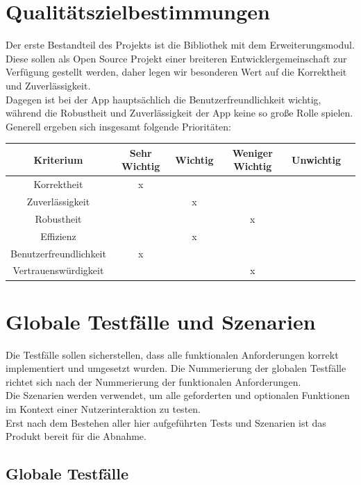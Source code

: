 \documentclass[a4paper,12pt]{article}
\begin{document}
\section{Qualitätszielbestimmungen}
Der erste Bestandteil des Projekts ist die Bibliothek mit dem Erweiterungsmodul. Diese sollen als Open Source Projekt einer breiteren Entwicklergemeinschaft zur Verfügung gestellt werden, daher legen wir besonderen Wert auf die Korrektheit und Zuverlässigkeit.\\
Dagegen ist bei der App hauptsächlich die Benutzerfreundlichkeit wichtig, während die Robustheit und Zuverlässigkeit der App keine so große Rolle spielen. Generell ergeben sich insgesamt folgende Prioritäten:\\
\begin{tabular}[t]{|c|c|c|c|c|c|}
  \hline
  \textbf{Kriterium} & \textbf{Sehr Wichtig} & \textbf{Wichtig} & \textbf{Weniger Wichtig} & \textbf{Unwichtig}\\
  \hline
  \hline
  Korrektheit & x & & &\\ %
  \hline
  Zuverlässigkeit & & x & &\\ %
  \hline
  Robustheit & & & x &\\  %
  \hline
  Effizienz & & x & &\\ %
  \hline
  Benutzerfreundlichkeit & x & & &\\ %
  \hline
  Vertrauenswürdigkeit & & & x &\\ %
  \hline

\end{tabular}
\vspace{1cm}
\section{Globale Testfälle und Szenarien}
Die Testfälle sollen sicherstellen, dass alle funktionalen Anforderungen korrekt implementiert und umgesetzt wurden.
Die Nummerierung der globalen Testfälle richtet sich nach der Nummerierung der funktionalen Anforderungen.\\
Die Szenarien werden verwendet, um alle geforderten und optionalen Funktionen im Kontext einer Nutzerinteraktion zu testen.\\
Erst nach dem Bestehen aller hier aufgeführten Tests und Szenarien ist das Produkt bereit für die Abnahme.
  \subsection{Globale Testfälle}
\end{document}

